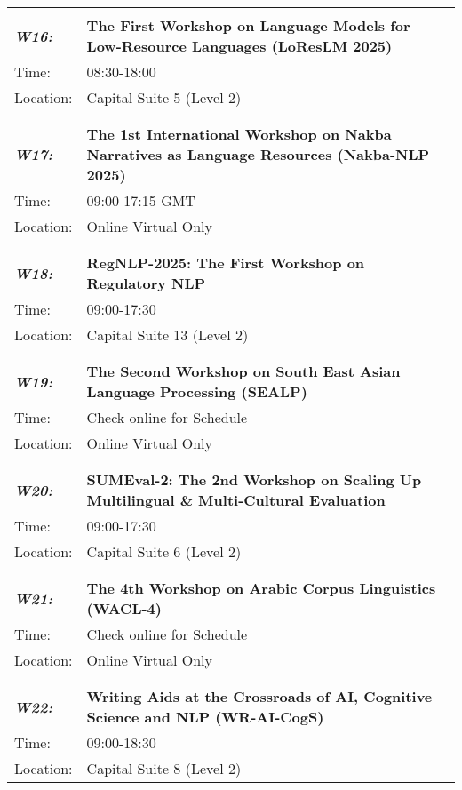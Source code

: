 \begin{longtable}{p{15mm}p{100mm}}
\hline\\
\emph{\textbf{W16:}} & \textbf{The First Workshop on Language Models for Low-Resource Languages (LoResLM 2025)} \\
Time: & 08:30-18:00 \\
Location: & Capital Suite 5 (Level 2) \\\\
\hline\\
\emph{\textbf{W17:}} & \textbf{The 1st International Workshop on Nakba Narratives as Language Resources (Nakba-NLP 2025)} \\
Time: & 09:00-17:15 GMT \\
Location: & Online Virtual Only \\\\
\hline\\
\emph{\textbf{W18:}} & \textbf{RegNLP-2025: The First Workshop on Regulatory NLP} \\
Time: & 09:00-17:30 \\
Location: & Capital Suite 13 (Level 2) \\\\
\hline\\
\emph{\textbf{W19:}} & \textbf{The Second Workshop on South East Asian Language Processing (SEALP)} \\
Time: & Check online for Schedule \\
Location: & Online Virtual Only \\\\
\hline\\
\emph{\textbf{W20:}} & \textbf{SUMEval-2: The 2nd Workshop on Scaling Up Multilingual \& Multi-Cultural Evaluation} \\
Time: & 09:00-17:30 \\
Location: & Capital Suite 6 (Level 2) \\\\
\hline\\
\emph{\textbf{W21:}} & \textbf{The 4th Workshop on Arabic Corpus Linguistics (WACL-4)} \\
Time: & Check online for Schedule \\
Location: & Online Virtual Only \\\\
\hline\\
\emph{\textbf{W22:}} & \textbf{Writing Aids at the Crossroads of AI, Cognitive Science and NLP (WR-AI-CogS)} \\
Time: & 09:00-18:30 \\
Location: & Capital Suite 8 (Level 2) \\
\end{longtable}
